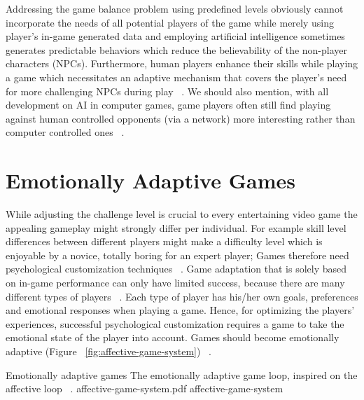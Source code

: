 Addressing the game balance problem using predefined levels obviously cannot incorporate the needs of all potential players of the game while merely using player's in-game generated data and employing artificial intelligence sometimes generates predictable behaviors which reduce the believability of the non-player characters (NPCs). Furthermore, human players enhance their skills while playing a game which necessitates an adaptive mechanism that covers the player's need for more challenging NPCs during play ~\cite{olesen2008real}. We should also mention, with all development on AI in computer games, game players often still find playing against human controlled opponents (via a network) more interesting rather than computer controlled ones ~\cite{weibel2008playing}.

\section{Emotionally Adaptive Games}


While adjusting the challenge level is crucial to every entertaining video game the appealing gameplay might strongly differ per individual. For example skill level differences between different players might make a difficulty level which is enjoyable by a novice, totally boring for an expert player; Games therefore need psychological customization techniques ~\cite{saari2005towards}. Game adaptation that is solely based on in-game performance can only have limited success, because there are many different types of players ~\cite{onlin2014bartle}. Each type of player has his/her own goals, preferences and emotional responses when playing a game. Hence, for optimizing the players' experiences, successful psychological customization requires a game to take the emotional state of the player into account. Games should become emotionally adaptive (Figure ~\ref{fig:affective-game-system}) ~\cite{tijs2009creating}.

\img
{Emotionally adaptive games}
{The emotionally adaptive game loop, inspired on the affective loop ~\cite{sundstrom2005user}.}
{affective-game-system.pdf}
{affective-game-system}


